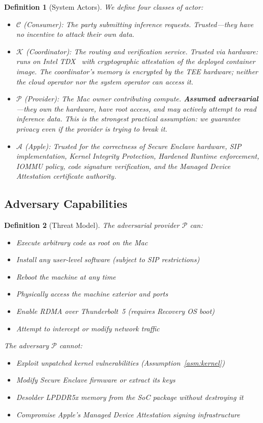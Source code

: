\documentclass[10pt,twocolumn,letterpaper]{article}
\newtheorem{definition}{Definition}
\begin{document}
\begin{definition}[System Actors]
\label{def:actors}
We define four classes of actor:
\begin{itemize}[leftmargin=*,itemsep=1pt,topsep=2pt]
    \item $\mathcal{C}$ (Consumer): The party submitting inference requests. Trusted---they have no incentive to attack their own data.
    \item $\mathcal{K}$ (Coordinator): The routing and verification service. Trusted via hardware: runs on Intel TDX~\cite{intel-tdx} with cryptographic attestation of the deployed container image. The coordinator's memory is encrypted by the TEE hardware; neither the cloud operator nor the system operator can access it.
    \item $\mathcal{P}$ (Provider): The Mac owner contributing compute. \textbf{Assumed adversarial}---they own the hardware, have root access, and may actively attempt to read inference data. This is the strongest practical assumption: we guarantee privacy even if the provider is trying to break it.
    \item $\mathcal{A}$ (Apple): Trusted for the correctness of Secure Enclave hardware, SIP implementation, Kernel Integrity Protection, Hardened Runtime enforcement, IOMMU policy, code signature verification, and the Managed Device Attestation certificate authority.
\end{itemize}
\end{definition}

\subsection{Adversary Capabilities}

\begin{definition}[Threat Model]
\label{def:threat}
The adversarial provider $\mathcal{P}$ can:
\begin{itemize}[leftmargin=*,itemsep=1pt]
    \item Execute arbitrary code as root on the Mac
    \item Install any user-level software (subject to SIP restrictions)
    \item Reboot the machine at any time
    \item Physically access the machine exterior and ports
    \item Enable RDMA over Thunderbolt~5 (requires Recovery OS boot)
    \item Attempt to intercept or modify network traffic
\end{itemize}
The adversary $\mathcal{P}$ \emph{cannot}:
\begin{itemize}[leftmargin=*,itemsep=1pt]
    \item Exploit unpatched kernel vulnerabilities (Assumption~\ref{asm:kernel})
    \item Modify Secure Enclave firmware or extract its keys
    \item Desolder LPDDR5x memory from the SoC package without destroying it
    \item Compromise Apple's Managed Device Attestation signing infrastructure
\end{itemize}
\end{definition}
\end{document}
